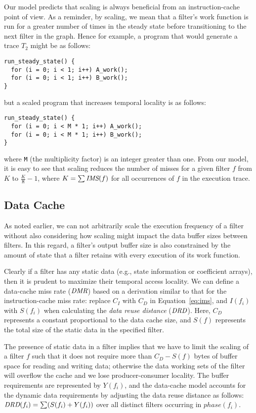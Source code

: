 Our model predicts that scaling is always beneficial from an
instruction-cache point of view. As a reminder, by scaling, we mean
that a filter's work function is run for a greater number of times in
the steady state before transitioning to the next filter in the
graph. Hence for example, a program that would generate a trace $T_2$
might be as follows:
{\small
\begin{verbatim}
run_steady_state() {
  for (i = 0; i < 1; i++) A_work();
  for (i = 0; i < 1; i++) B_work();
}
\end{verbatim}}
\noindent but a scaled program that increases temporal locality is as follows:
{\small
\begin{verbatim}
run_steady_state() {
  for (i = 0; i < M * 1; i++) A_work();
  for (i = 0; i < M * 1; i++) B_work();
}
\end{verbatim}}
\noindent where \texttt{M} (the multiplicity factor) is an integer greater than
one. From our model, it is easy to see that scaling reduces the number
of misses for a given filter $f$ from $K$ to $\frac{K}{\texttt{M}}- 1$, where $K =
\sum \mbox{\it IMS}(f)$ for all occurrences of $f$ in  the execution trace.

\subsection{Data Cache}

As noted earlier, we can not arbitrarily scale the execution frequency
of a filter without also considering how scaling might impact
the data buffer sizes between filters. In this regard, a filter's
output buffer size is also constrained by the amount of state that a
filter retains with every execution of its work function.

Clearly if a filter has any static data (e.g., state information or
coefficient arrays), then it is prudent to maximize their temporal
access locality. We can define a data-cache miss rate ($\mbox{\it DMR}$) based on
a derivation similar to that for the instruction-cache miss rate:
replace $C_I$ with $C_D$ in Equation~\ref{eq:ims}, and $I(f_i)$ with
$S(f_i)$ when calculating the {\it data reuse distance} ($\mbox{\it DRD}$). 
Here, $C_D$ represents a constant proportional to the data cache size,
and $S(f)$ represents the total size of the static data in the
specified filter.

The presence of static data in a filter implies that we have to limit
the scaling of a filter $f$ such that it does not require more than $C_D -
S(f)$ bytes of buffer space for reading and writing data; otherwise
the data working sets of the filter will overflow the cache and we lose
producer-consumer locality. The buffer requirements are represented by
$Y(f_i)$, and the data-cache model accounts for the dynamic data
requirements by adjusting the data reuse distance as follows:
$\mbox{\it DRD}(f_i) = \sum (S(f_i) + Y(f_i))$ over all distinct filters occurring
in $phase(f_i)$.

